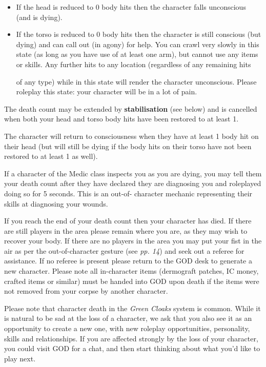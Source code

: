 \documentclass{scrbook}
\begin{document}
\begin{itemize}
\item If the head is reduced to 0 body hits then the character falls unconscious (and is dying).

\item If the torso is reduced to 0 body hits then the character is still conscious (but dying) and can call out (in agony) for help. You can crawl very slowly in this state (as long as you have use of at least one arm), but cannot use any items or skills. Any further hits to any location (regardless of any remaining hits

of any type) while in this state will render the character unconscious. Please roleplay this state: your character will be in a lot of pain.

\end{itemize}
The death count may be extended by \textbf{stabilisation} (see below) and is cancelled when both your head and torso body hits have been restored to at least 1.

The character will return to consciousness when they have at least 1 body hit on their head (but will still be dying if the body hits on their torso have not been restored to at least 1 as well).

If a character of the Medic class inspects you as you are dying, you may tell them your death count after they have declared they are diagnosing you and roleplayed doing so for 5 seconds. This is an out-of- character mechanic representing their skills at diagnosing your wounds.

If you reach the end of your death count then your character has died. If there are still players in the area please remain where you are, as they may wish to recover your body. If there are no players in the area you may put your fist in the air as per the out-of-character gesture (see \textit{pp. 14}) and seek out a referee for assistance. If no referee is present please return to the GOD desk to generate a new character. Please note all in-character items (dermograft patches, IC money, crafted items or similar) must be handed into GOD upon death if the items were not removed from your corpse by another character.

Please note that character death in the \textit{Green Cloaks} system is common. While it is natural to be sad at the loss of a character, we ask that you also see it as an opportunity to create a new one, with new roleplay opportunities, personality, skills and relationships. If you are affected strongly by the loss of your character, you could visit GOD for a chat, and then start thinking about what you'd like to play next.
\end{document}
